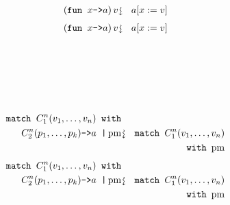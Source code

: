 \documentclass{beamer}
\newcommand{\assign}{:=}
\newcommand{\downsquigarrow}{{\mbox{\rotatebox[origin=c]{-90}{$\rightsquigarrow$}}}}
\newcommand{\tmop}[1]{\ensuremath{\operatorname{#1}}}
\newcommand{\tmverbatim}[1]{\text{{\ttfamily{#1}}}}
\begin{document}
{\hlopt{ \ \ \ (}}{}{\hlopt{(}}{}{\hlopt{,
(}}{}{\hlopt{(}}{}{\hlopt{,
}}{}{\hlopt{))))}}
\begin{eqnarray*}
  \left( \text{\tmverbatim{fun }} x \text{\tmverbatim{->}} a \right) v &
  \downsquigarrow & a [x \assign v]
\end{eqnarray*}
{\newpage}
\begin{eqnarray*}
  \left( \text{\tmverbatim{fun }} x \text{\tmverbatim{->}} a \right) v &
  \downsquigarrow & a [x \assign v]
\end{eqnarray*}
{\hlstd{ \ }}{\hlopt{(}}{}{}{\hlopt{(}}{}{\hlopt{, (}}{}{\hlopt{(}}{}{\hlopt{, }}{}{\hlopt{)))
}}{}{\hlendline{}}\\
{\hlstd{ \ }}{\hlopt{ \ \textbar }}{}{\hlopt{->
}}{}{\hlendline{}}\\
{\hlstd{ \ }}{\hlopt{ \ \textbar }}{}{\hlopt{(}}{}{\hlopt{, }}{}{\hlopt{) -> }}{}{\hlopt{+ }}{\hlopt{(}}{}{\hlopt{(}}{}{}{\hlopt{->}}{\hlendline{}}\\
{\hlstd{ \ \ \ \ \ }}{}{}{}{\hlendline{}}\\
{\hlstd{ \ \ \ \ \ \ \ }}{\hlopt{\textbar }}{}{\hlopt{->
}}{}{\hlendline{}}\\
{\hlstd{ \ \ \ }}{\hlopt{ \ \ \ \textbar }}{}{\hlopt{(}}{}{\hlopt{, }}{}{\hlopt{) -> }}{}{\hlopt{+ }}{}{\hlopt{))}}{}{\hlopt{) }}
\begin{eqnarray*}
  \text{\tmverbatim{match }} C_1^n (v_1, \ldots, v_n) \text{\tmverbatim{
  with}} &  & \\
  C_2^n (p_1, \ldots, p_k) \text{\tmverbatim{->}} a \text{\tmverbatim{
  \textbar }} \tmop{pm} & \downsquigarrow & \text{\tmverbatim{match }} C_1^n
  (v_1, \ldots, v_n)\\
  &  & \text{\tmverbatim{with} } \tmop{pm}
\end{eqnarray*}
{\newpage}
\begin{eqnarray*}
  \text{\tmverbatim{match }} C_1^n (v_1, \ldots, v_n) \text{\tmverbatim{
  with}} &  & \\
  C_2^n (p_1, \ldots, p_k) \text{\tmverbatim{->}} a \text{\tmverbatim{
  \textbar }} \tmop{pm} & \downsquigarrow & \text{\tmverbatim{match }} C_1^n
  (v_1, \ldots, v_n)\\
  &  & \text{\tmverbatim{with} } \tmop{pm}
\end{eqnarray*}
\end{document}
